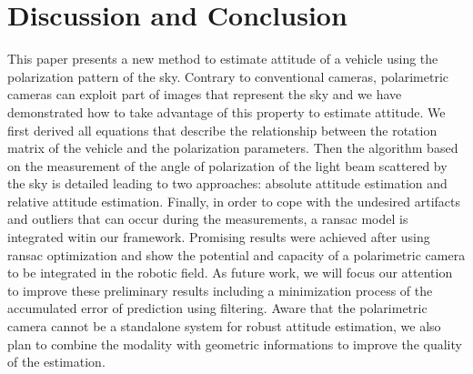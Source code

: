 \section{Discussion and Conclusion}
\label{sec:dis-con}

This paper presents a new method to estimate attitude of a vehicle using the
polarization pattern of the sky.  Contrary to conventional cameras,
polarimetric cameras can exploit part of images that represent the sky and we
have demonstrated how to take advantage of this property to estimate
attitude. We first derived all equations that describe the relationship between
the rotation matrix of the vehicle and the polarization parameters. Then the
algorithm based on the measurement of the angle of polarization of the light
beam scattered by the sky is detailed leading to two approaches: absolute
attitude estimation and relative attitude estimation.  Finally, in order to
cope with the undesired artifacts and outliers that can occur during the
measurements, a ransac model is integrated witin our framework.  Promising
results were achieved after using ransac optimization and show the potential
and capacity of a polarimetric camera to be integrated in the robotic field.
As future work, we will focus our attention to improve these preliminary
results including a minimization process of the accumulated error of prediction
using filtering. Aware that the polarimetric camera cannot be a standalone
system for robust attitude estimation, we also plan to combine the modality
with geometric informations to improve the quality of the estimation.



